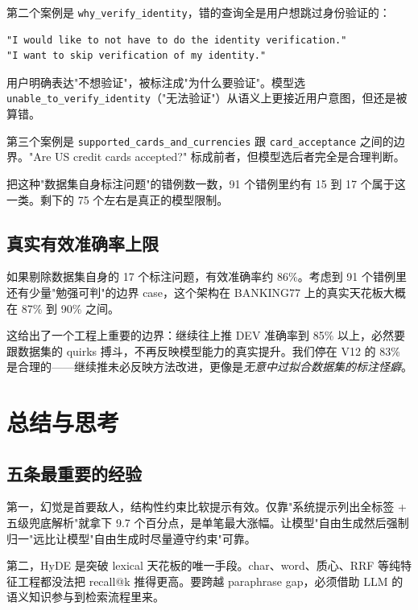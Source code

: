 \documentclass[11pt,a4paper]{article}
\begin{document}
第二个案例是 \texttt{why\_verify\_identity}，错的查询全是用户想跳过身份验证的：

\begin{verbatim}
"I would like to not have to do the identity verification."
"I want to skip verification of my identity."
\end{verbatim}

用户明确表达"不想验证"，被标注成"为什么要验证"。模型选 \texttt{unable\_to\_verify\_identity}（"无法验证"）从语义上更接近用户意图，但还是被算错。

第三个案例是 \texttt{supported\_cards\_and\_currencies} 跟 \texttt{card\_acceptance} 之间的边界。"Are US credit cards accepted?" 标成前者，但模型选后者完全是合理判断。

把这种"数据集自身标注问题"的错例数一数，91 个错例里约有 15 到 17 个属于这一类。剩下的 75 个左右是真正的模型限制。

\subsection{真实有效准确率上限}

如果剔除数据集自身的 17 个标注问题，有效准确率约 86\%。考虑到 91 个错例里还有少量"勉强可判"的边界 case，这个架构在 BANKING77 上的真实天花板大概在 87\% 到 90\% 之间。

这给出了一个工程上重要的边界：继续往上推 DEV 准确率到 85\% 以上，必然要跟数据集的 quirks 搏斗，不再反映模型能力的真实提升。我们停在 V12 的 83\% 是合理的——继续推未必反映方法改进，更像是\emph{无意中过拟合数据集的标注怪癖}。

\section{总结与思考}
\label{sec:conclusion}

\subsection{五条最重要的经验}

第一，幻觉是首要敌人，结构性约束比软提示有效。仅靠"系统提示列出全标签 + 五级兜底解析"就拿下 9.7 个百分点，是单笔最大涨幅。让模型"自由生成然后强制归一"远比让模型"自由生成时尽量遵守约束"可靠。

第二，HyDE 是突破 lexical 天花板的唯一手段。char、word、质心、RRF 等纯特征工程都没法把 recall@k 推得更高。要跨越 paraphrase gap，必须借助 LLM 的语义知识参与到检索流程里来。
\end{document}
